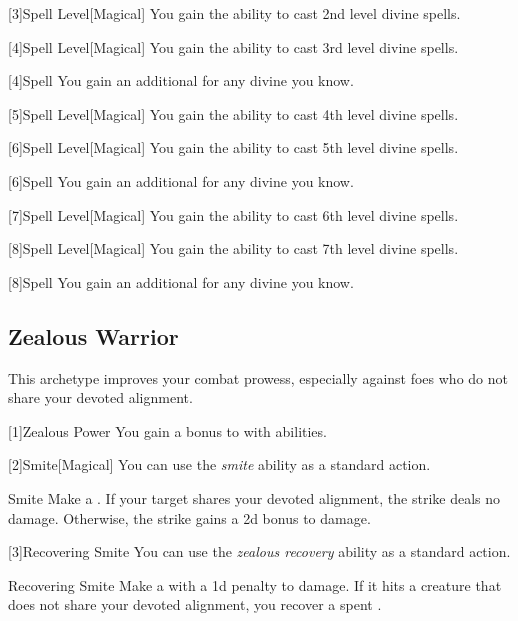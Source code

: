         [3]{Spell Level}[Magical] You gain the ability to cast 2nd level divine spells.

        [4]{Spell Level}[Magical] You gain the ability to cast 3rd level divine spells.

        [4]{Spell} You gain an additional  for any divine  you know.

        [5]{Spell Level}[Magical] You gain the ability to cast 4th level divine spells.

        [6]{Spell Level}[Magical] You gain the ability to cast 5th level divine spells.

        [6]{Spell} You gain an additional  for any divine  you know.

        [7]{Spell Level}[Magical] You gain the ability to cast 6th level divine spells.

        [8]{Spell Level}[Magical] You gain the ability to cast 7th level divine spells.

        [8]{Spell} You gain an additional  for any divine  you know.

    \subsection{Zealous Warrior}
        This archetype improves your combat prowess, especially against foes who do not share your devoted alignment.

        [1]{Zealous Power} You gain a  bonus to  with  abilities.

        [2]{Smite}[Magical] You can use the \textit{smite} ability as a standard action.
        \begin{apability}{Smite}
            Make a .
            If your target shares your devoted alignment, the strike deals no damage.
            Otherwise, the strike gains a \plus2d bonus to damage.
        \end{apability}

        [3]{Recovering Smite} You can use the \textit{zealous recovery} ability as a standard action.
        \begin{freeability}{Recovering Smite}
            Make a  with a \minus1d penalty to damage.
            If it hits a creature that does not share your devoted alignment, you recover a spent .
        \end{freeability}

